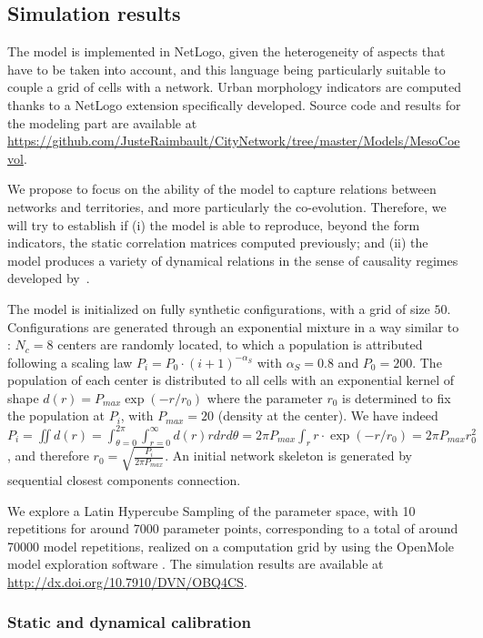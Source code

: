 \documentclass[11pt]{article}
\begin{document}
\subsection{Simulation results}

The model is implemented in NetLogo, given the heterogeneity of aspects that have to be taken into account, and this language being particularly suitable to couple a grid of cells with a network. Urban morphology indicators are computed thanks to a NetLogo extension specifically developed. Source code and results for the modeling part are available at \url{https://github.com/JusteRaimbault/CityNetwork/tree/master/Models/MesoCoevol}.

We propose to focus on the ability of the model to capture relations between networks and territories, and more particularly the co-evolution. Therefore, we will try to establish if (i) the model is able to reproduce, beyond the form indicators, the static correlation matrices computed previously; and (ii) the model produces a variety of dynamical relations in the sense of causality regimes developed by~\cite{raimbault2017identification}.


The model is initialized on fully synthetic configurations, with a grid of size $50$. Configurations are generated through an exponential mixture in a way similar to \cite{anas1998urban}: $N_c = 8$ centers are randomly located, to which a population is attributed following a scaling law $P_i = P_0\cdot (i+1)^{-\alpha_S}$ with $\alpha_S = 0.8$ and $P_0 = 200$. The population of each center is distributed to all cells with an exponential kernel of shape $d(r) = P_{max}\exp\left( - r / r_0\right)$ where the parameter $r_0$ is determined to fix the population at $P_i$, with $P_{max} = 20$ (density at the center). We have indeed $P_i = \iint d(r) = \int_{\theta=0}^{2\pi} \int_{r=0}^{\infty} d(r) rdrd\theta = 2 \pi P_{max} \int_r r\cdot \exp\left( - r / r_0\right) = 2 \pi P_{max} r_0^2$, and therefore $r_0 = \sqrt{\frac{P_i}{2\pi P_{max}}}$. An initial network skeleton is generated by sequential closest components connection.


We explore a Latin Hypercube Sampling of the parameter space, with 10 repetitions for around 7000 parameter points, corresponding to a total of around 70000 model repetitions, realized on a computation grid by using the OpenMole model exploration software \citep{reuillon2013openmole}. The simulation results are available at \url{http://dx.doi.org/10.7910/DVN/OBQ4CS}.


\subsubsection{Static and dynamical calibration}
\end{document}
